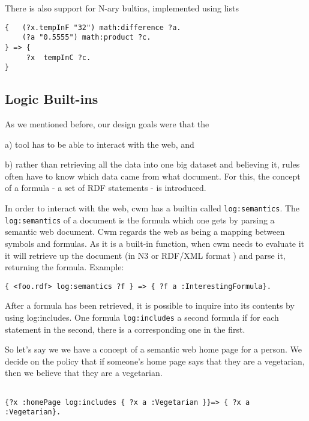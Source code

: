 \documentclass{tlp}
\begin{document}
\par There is also support for N-ary bultins, implemented using
lists
\begin{verbatim}
{   (?x.tempInF "32") math:difference ?a.
    (?a "0.5555") math:product ?c.
} => {
     ?x  tempInC ?c.
}
\end{verbatim}
\subsection{\empty Logic Built-ins}
  

\par As we mentioned before, our design goals were that the

\par a) tool has to be able to interact with the web, and

\par b) rather than retrieving all the data into one big dataset and
believing it, rules often have to know which data came from what
document. For this, the concept of a formula - a set of RDF
statements - is introduced.

\par In order to interact with the web, cwm has a builtin called
{\tt log:semantics}. The {\tt log:semantics} of a
document is the formula which one gets by parsing a semantic web
document. Cwm regards the web as being a mapping between symbols
and formulas. As it is a built-in function, when cwm needs to
evaluate it it will retrieve up the document (in N3 or RDF/XML
format ) and parse it, returning the formula. Example:
\begin{verbatim}
{ <foo.rdf> log:semantics ?f } => { ?f a :InterestingFormula}.
\end{verbatim}

\par After a formula has been retrieved, it is possible to inquire
into its contents by using log:includes. One formula
{\tt log:includes} a second formula if for each statement in
the second, there is a corresponding one in the first.

\par So let's say we we have a concept of a semantic web home page
for a person. We decide on the policy that if someone's home page
says that they are a vegetarian, then we believe that they are a
vegetarian.
\begin{verbatim}

{?x :homePage log:includes { ?x a :Vegetarian }}=> { ?x a :Vegetarian}.
\end{verbatim}
\end{document}
